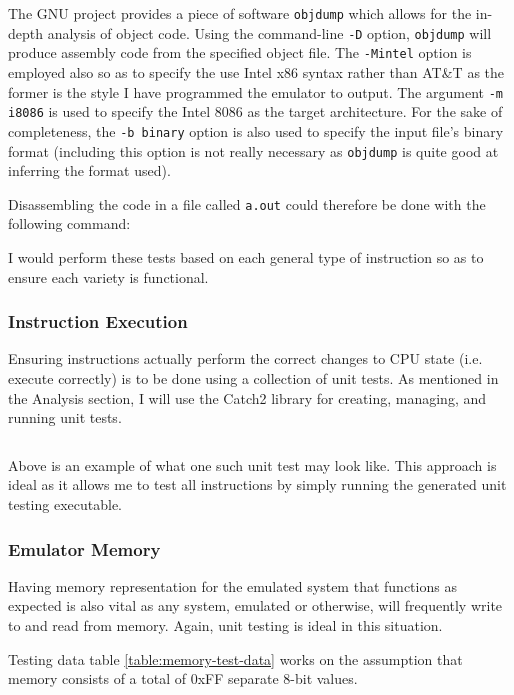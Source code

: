         The GNU project provides a piece of software \texttt{objdump} which allows for the in-depth analysis of object code. Using the command-line \texttt{-D} option, \texttt{objdump} will produce assembly code from the specified object file. The \texttt{-Mintel} option is employed also so as to specify the use Intel x86 syntax rather than AT\&T as the former is the style I have programmed the emulator to output. The argument \texttt{-m i8086} is used to specify the Intel 8086 as the target architecture. For the sake of completeness, the \texttt{-b binary} option is also used to specify the input file's binary format (including this option is not really necessary as \texttt{objdump} is quite good at inferring the format used).

        Disassembling the code in a file called \texttt{a.out} could therefore be done with the following command: 

        I would perform these tests based on each general type of instruction so as to ensure each variety is functional.

    \subsubsection{Instruction Execution}
        Ensuring instructions actually perform the correct changes to CPU state (i.e. execute correctly) is to be done using a collection of unit tests. As mentioned in the Analysis section, I will use the Catch2 library for creating, managing, and running unit tests.

        \inputminted{c++}{code/testexample.cpp}

        Above is an example of what one such unit test may look like. This approach is ideal as it allows me to test all instructions by simply running the generated unit testing executable.

    \subsubsection{Emulator Memory}
        Having memory representation for the emulated system that functions as expected is also vital as any system, emulated or otherwise, will frequently write to and read from memory. Again, unit testing is ideal in this situation.

        Testing data table \ref{table:memory-test-data} works on the assumption that memory consists of a total of 0xFF separate 8-bit values.

